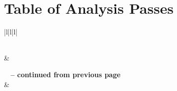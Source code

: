 
\chapter[Table of Analysis Passes]{Table of Analysis Passes}



\begin{longtable}{|l|l|l|}
  \caption{LLVM Analysis Passes} \label{tab:analysis} \\

  \hline {} &  \\ \hline
  \endfirsthead

  {{\bfseries \tablename\ \thetable{} -- continued from previous page}} \\
  \hline {} &  \\ \hline
  \endhead

  \hline {} \\ \hline
  \endfoot

  \hline \hline

  \endlastfoot


\end{longtable}
